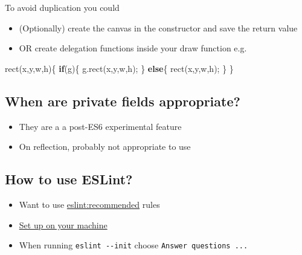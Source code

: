 \documentclass[]{article}
\newenvironment{Shaded}{}{}
\newcommand{\AttributeTok}[1]{\textcolor[rgb]{0.49,0.56,0.16}{#1}}
\newcommand{\ControlFlowTok}[1]{\textcolor[rgb]{0.00,0.44,0.13}{\textbf{#1}}}
\newcommand{\NormalTok}[1]{#1}
\newcommand{\OperatorTok}[1]{\textcolor[rgb]{0.40,0.40,0.40}{#1}}
\newcommand{\VariableTok}[1]{\textcolor[rgb]{0.10,0.09,0.49}{#1}}
\providecommand{\tightlist}{%
  \setlength{\itemsep}{0pt}\setlength{\parskip}{0pt}}
\begin{document}
To avoid duplication you could

\begin{itemize}
\tightlist
\item
  (Optionally) create the canvas in the constructor and save the return
  value
\item
  OR create delegation functions inside your draw function e.g.
\end{itemize}

\begin{Shaded}
\begin{Highlighting}[]
   \AttributeTok{rect}\NormalTok{(x}\OperatorTok{,}\NormalTok{y}\OperatorTok{,}\NormalTok{w}\OperatorTok{,}\NormalTok{h)}\OperatorTok{\{}
     \ControlFlowTok{if}\NormalTok{(g)}\OperatorTok{\{}
       \VariableTok{g}\NormalTok{.}\AttributeTok{rect}\NormalTok{(x}\OperatorTok{,}\NormalTok{y}\OperatorTok{,}\NormalTok{w}\OperatorTok{,}\NormalTok{h)}\OperatorTok{;}
     \OperatorTok{\}}
     \ControlFlowTok{else}\OperatorTok{\{}
       \AttributeTok{rect}\NormalTok{(x}\OperatorTok{,}\NormalTok{y}\OperatorTok{,}\NormalTok{w}\OperatorTok{,}\NormalTok{h)}\OperatorTok{;}
     \OperatorTok{\}}
   \OperatorTok{\}}
\end{Highlighting}
\end{Shaded}

\hypertarget{when-are-private-fields-appropriate}{%
\subsection{When are private fields
appropriate?}\label{when-are-private-fields-appropriate}}

\begin{itemize}
\tightlist
\item
  They are a a post-ES6 experimental feature
\item
  On reflection, probably not appropriate to use
\end{itemize}

\hypertarget{how-to-use-eslint}{%
\subsection{How to use ESLint?}\label{how-to-use-eslint}}

\begin{itemize}
\tightlist
\item
  Want to use \href{https://eslint.org/docs/rules/}{eslint:recommended}
  rules
\item
  \href{https://eslint.org/docs/user-guide/getting-started}{Set up on
  your machine}
\item
  When running \texttt{eslint\ -\/-init} choose
  \texttt{Answer\ questions\ ...}
\end{itemize}
\end{document}

